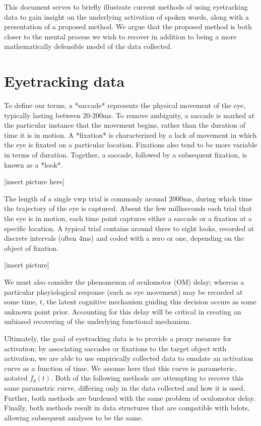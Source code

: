 \documentclass{article}
\begin{document}
This document serves to briefly illustrate current methods of using eyetracking data to gain insight on the underlying activation of spoken words, along with a presentation of a proposed method. We argue that the proposed method is both closer to the mental process we wish to recover in addition to being a more mathematically defensible model of the data collected.

\section{Eyetracking data} 

To define our terms, a *saccade* represents the physical movement of the eye, typically lasting between 20-200ms. To remove ambiguity, a saccade is marked at the particular instance that the movement begins, rather than the duration of time it is in motion. A *fixation* is characterized by a lack of movement in which the eye is fixated on a particular location. Fixations also tend to be more variable in terms of duration. Together, a saccade, followed by a subsequent fixation, is known as a *look*.

[insert picture here]

The length of a single vwp trial is commonly around 2000ms, during which time the trajectory of the eye is captured. Absent the few milliseconds each trial that the eye is in motion, each time point captures either a saccade or a fixation at a specific location. A typical trial contains around three to eight looks, recorded at discrete intervals (often 4ms) and coded with a zero or one, depending on the object of fixation.

[insert picture]


We must also consider the phenomenon of oculomotor (OM) delay; whereas a particular phsyiological response (such as eye movement) may be recorded at some time, $t$, the latent cognitive mechanism guiding this decision occurs as some unknown point prior. Accounting for this delay will be critical in creating an unbiased recovering of the underlying functional mechanism.

Ultimately, the goal of eyetracking data is to provide a proxy measure for activation; by associating saccades or fixations to the target object with activation, we are able to use empirically collected data to emulate an activation curve as a function of time. We assume here that this curve is parameteric, notated $f_{\theta}(t)$. Both of the following methods are attempting to recover this same parametric curve, differing only in the data collected and how it is used. Further, both methods are burdened with the same problem of oculomotor delay. Finally, both methods result in data structures that are compatible with bdots, allowing subsequent analyses to be the same.
\end{document}
